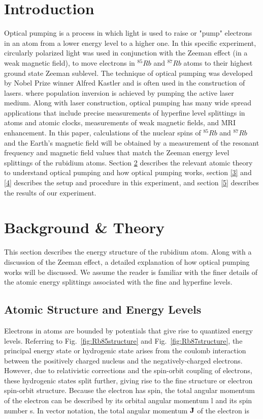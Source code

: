 \documentclass[%
 aip,
rsi,%
 amsmath,amssymb,
 reprint,%
author-numerical,%
]{revtex4-1}
\begin{document}
\section{Introduction} \label{1}
Optical pumping is a process in which light is used to raise or "pump" electrons in an atom from a lower energy level to a higher one. In this specific experiment, circularly polarized light was used in conjunction with the Zeeman effect (in a weak magnetic field), to move electrons in $^{85}Rb$ and $^{87}Rb$ atoms to their highest ground state Zeeman sublevel. \newline
\indent The technique of optical pumping was developed by Nobel Prize winner Alfred Kastler and is often used in the construction of lasers. where population inversion is achieved by pumping the active laser medium. Along with laser construction, optical pumping has many wide spread applications that include precise measurements of hyperfine level splittings in atoms and atomic clocks, measurements of weak magnetic fields, and MRI enhancement.\cite{Arditi} \newline
\indent In this paper, calculations of the nuclear spins of $^{85}Rb$ and $^{87}Rb$ and the Earth's magnetic field will be obtained by a measurement of the resonant frequency and magnetic field values that match the Zeeman energy level splittings of the rubidium atoms. Section \ref{2} describes the relevant atomic theory to understand optical pumping and how optical pumping works, section \ref{3} and \ref{4} describes the setup and procedure in this experiment, and section \ref{5} describes the results of our experiment.

\section{Background \& Theory} \label{2}
This section describes the energy structure of the rubidium atom. Along with a discussion of the Zeeman effect, a detailed explanation of how optical pumping works will be discussed. We assume the reader is familiar with the finer details of the atomic energy splittings associated with the fine and hyperfine levels.

\subsection{Atomic Structure and Energy Levels}
Electrons in atoms are bounded by potentials that give rise to quantized energy levels. Referring to Fig.~\ref{fig:Rb85structure} and Fig.~\ref{fig:Rb87structure}, the principal energy state or hydrogenic state arises from the coulomb interaction between the positively charged nucleus and the negatively-charged electrons. \newline
\indent However, due to relativistic corrections and the spin-orbit coupling of electrons, these hydrogenic states split further, giving rise to the fine structure or electron spin-orbit structure. Because the electron has spin, the total angular momentum of the electron can be described by its orbital angular momentum l and its spin number s. In vector notation, the total angular momentum $\bf{J}$ of the electron is 
\end{document}
